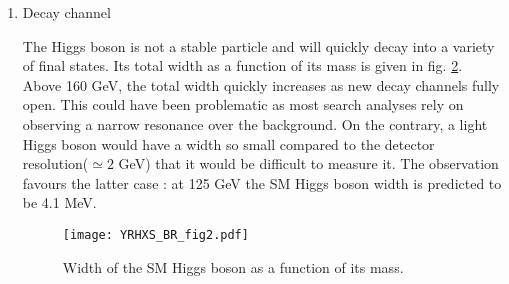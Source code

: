 \begin{enumerate}
Finally, H can be produced by the interaction of a pair of top quarks.
This production process mode has a lower cross-section than the previous ones and has some similarities with the VBF process, as a top pair is also present in the final state and create a jet.
The study of this production process rely on identifying jets produced by bottom quarks produced by the decay of the top quarks.
The ttH production has a dedicated analysis in ATLAS.


With the increase of the energy of the LHC in 2015 up to 13 TeV, the production cross-sections of many reactions (including Higgs boson production) increase.
Fig. \ref{fig:org96cd9f6} shows the ratio between the 13 TeV cross section and the 8 TeV for a set of processes.
It shows that even for the Higgs boson, this ratio is different depending on the production mode : ranging from 2.0 for WH to 3.9 for ttH.
Finally, this increase of energy plays a major role in the improvement of measurement of the Higgs boson properties, in particular for the identification of the ttH production mode.

\begin{figure}[htbp]
\centering
\texttt{[image: crossSectionRatio-13-8TeV.pdf]}
\caption{\label{fig:org96cd9f6}
Ratio of processes cross-section for colliding protons at \(\sqrt{s}=13\) TeV with respect to 8 TeV for a set of processes. Credit : A. Hoecker}
\end{figure}


\item Decay channel
\label{sec:orgf4c19b0}

The Higgs boson is not a stable particle and will quickly decay into a variety of final states.
Its total width as a function of its mass is given in fig. \ref{fig:org26dfcff}.
Above 160 GeV, the total width quickly increases as new decay channels fully open.
This could have been problematic as most search analyses rely on observing a narrow resonance over the background.
On the contrary, a light Higgs boson would have a width so small compared to the detector resolution(\(\simeq 2\)  GeV) that it would be difficult to measure it.
The observation favours the latter case : at 125 GeV the SM Higgs boson width is predicted to be 4.1 MeV.

\begin{figure}[htbp]
\centering
\texttt{[image: YRHXS\_BR\_fig2.pdf]}
\caption{\label{fig:org26dfcff}
Width of the SM Higgs boson as a function of its mass. \cite{CERN-2013-004}}
\end{figure}


\end{enumerate}
